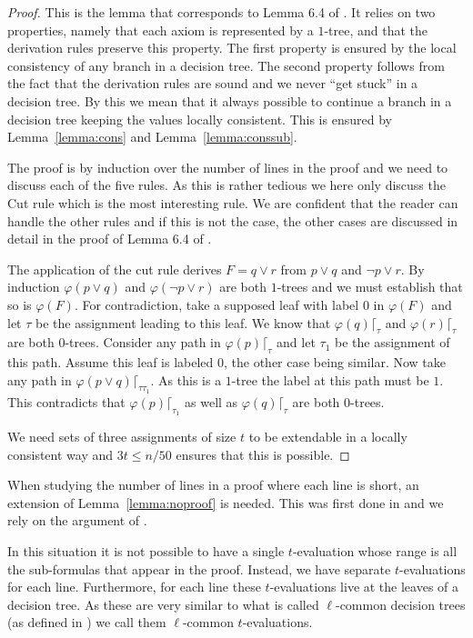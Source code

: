 \documentclass{article}\usepackage[a4paper,margin=20mm]{geometry}
\begin{document}
\begin{proof}
This is the lemma that corresponds to Lemma 6.4 of
\cite{jhtseitin}.
It relies on two properties, namely that each axiom is represented
by a $1$-tree, and that the derivation rules preserve this property.
The first property is ensured by the local consistency
of any branch in a decision tree.  The second property
follows from the fact that the derivation rules are sound
and we never ``get stuck'' in a decision tree.  By this
we mean that it always possible to continue a branch
in a decision tree keeping the values locally consistent.
This is ensured by Lemma~\ref{lemma:cons} and Lemma~\ref{lemma:conssub}.

The proof is by induction over the number of lines in the proof
and we need to discuss each of the five rules.  As this is
rather tedious we here only discuss the Cut rule which
is the most interesting rule.  We are confident
that the reader can handle the other rules and if this is not
the case, the other cases are discussed in detail in the
proof of Lemma 6.4 of \cite{jhtseitin}.

The application of the cut rule derives $F= q \lor r$ from
$p \lor q$ and $\neg p \lor r$.  By induction $\varphi(p \lor q)$
and $\varphi (\neg p \lor r)$ are both $1$-trees and we must
establish that so is $\varphi (F)$.
For contradiction, take a supposed leaf with label $0$ 
in $\varphi(F)$ and let $\tau$ be the assignment leading to this leaf. 
We know that $\varphi(q)\lceil_\tau$ and $\varphi(r)\lceil_\tau$ are
both $0$-trees.
Consider any path in $\varphi (p) \lceil_\tau$ and let $\tau_1$ be
the assignment of this path.  Assume this leaf is
labeled $0$, the other case being similar.  Now take
any path in $\varphi(p \lor q)\lceil_{\tau \tau_1}$.
As this is a $1$-tree the label at this path must
be $1$.  This contradicts that $\varphi(p) \lceil_{\tau_1}$
as well as $\varphi(q) \lceil_{\tau}$ are both $0$-trees.

We need sets of three assignments of size $t$ to be extendable
in  a locally consistent way and $3t \leq n/50$ ensures
that this is possible.
\end{proof}

When studying the number of lines in a proof where each line
is short, an extension of Lemma~\ref{lemma:noproof} is needed.
This was first done in \cite{PRT21} and we rely on
the argument of \cite{jhkr}.  

In this situation it is not possible to have
a single $t$-evaluation whose range is all the sub-formulas
that appear in the proof.  Instead, we have separate
$t$-evaluations for each line.  Furthermore, for each
line these $t$-evaluations live at the leaves of a decision
tree.  As these are very similar to what is called $\ell$-common decision
trees (as defined in \cite{jhmultiswitch}) we call them 
$\ell$-common $t$-evaluations.
\end{document}
